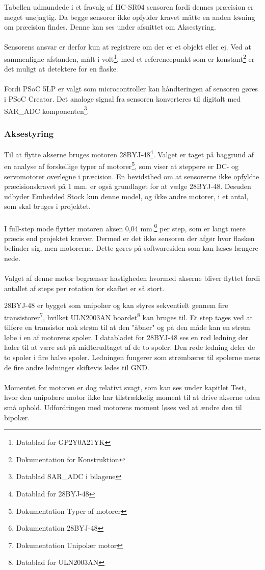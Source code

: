 \noindent
Tabellen udmundede i et fravalg af HC-SR04 sensoren fordi dennes præcision er meget unøjagtig. Da begge sensorer ikke opfylder kravet måtte en anden løsning om præcision findes. Denne kan ses under afsnittet om Aksestyring.
\\
\\
Sensorens ansvar er derfor kun at registrere om der er et objekt eller ej. Ved at sammenligne afstanden, målt i volt\footnote{Datablad for GP2Y0A21YK}, med et referencepunkt som er konstant\footnote{Dokumentation for Konstruktion} er det muligt at detektere for en flaske.
\\
\\
Fordi PSoC 5LP er valgt som microcontroller kan håndteringen af sensoren gøres i PSoC Creator. Det analoge signal fra sensoren konverteres til digitalt med SAR\_ADC komponenten\footnote{Datablad SAR\_ADC i bilagene}.

\subsubsection{Aksestyring}
\label{sec:HW_Aksestyring}
Til at flytte akserne bruges motoren 28BYJ-48\footnote{Datablad for 28BYJ-48}. Valget er taget på baggrund af en analyse af forskellige typer af motorer\footnote{Dokumentation Typer af motorer}, som viser at steppere er DC- og servomotorer overlegne i præcision. En bevidsthed om at sensorerne ikke opfyldte præcisionskravet på 1 mm. er også grundlaget for at vælge 28BYJ-48. Desuden udbyder Embedded Stock kun denne model, og ikke andre motorer, i et antal, som skal bruges i projektet.
\\
\\
I full-step mode flytter motoren aksen 0,04 mm.\footnote{Dokumentation 28BYJ-48} per step, som er langt mere præcis end projektet kræver. Dermed er det ikke sensoren der afgør hvor flasken befinder sig, men motorerne. Dette gøres på softwaresiden som kan læses længere nede.
\\
\\
Valget af denne motor begrænser hastigheden hvormed akserne bliver flyttet fordi antallet af steps per rotation for skaftet er så stort.

28BYJ-48 er bygget som unipolær og kan styres sekventielt gennem fire transistorer\footnote{Dokumentation Unipolær motor}, hvilket ULN2003AN boardet\footnote{Datablad for ULN2003AN} kan bruges til. Et step tages ved at tilføre en transistor nok strøm til at den "åbner" og på den måde kan en strøm løbe i en af motorens spoler. I databladet for 28BYJ-48 ses en rød ledning der lader til at være sat på midterudtaget af de to spoler. Den røde ledning deler de to spoler i fire halve spoler. Ledningen fungerer som strømbærer til spolerne mens de fire andre ledninger skiftevis ledes til GND.
\\
\\
Momentet for motoren er dog relativt svagt, som kan ses under kapitlet Test, hvor den unipolære motor ikke har tilstrækkelig moment til at drive akserne uden små ophold. Udfordringen med motorens moment løses ved at ændre den til bipolær.

